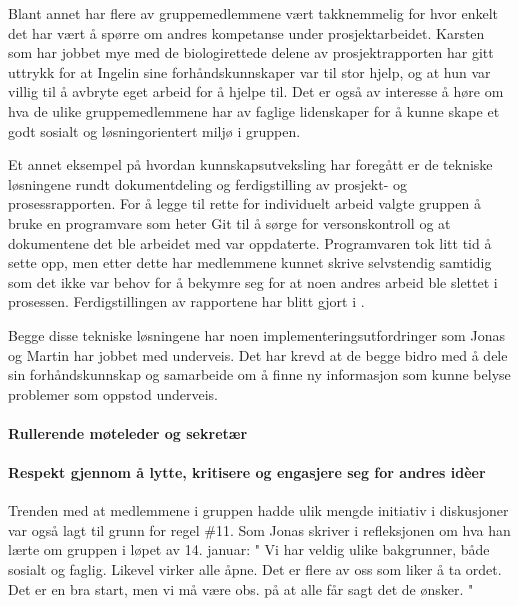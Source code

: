 Blant annet har flere av gruppemedlemmene vært takknemmelig for hvor enkelt det har vært å spørre om andres kompetanse under prosjektarbeidet.
Karsten som har jobbet mye med de biologirettede delene av prosjektrapporten har gitt uttrykk for at Ingelin sine forhåndskunnskaper var til stor hjelp, og at hun var villig til å avbryte eget arbeid for å hjelpe til.
Det er også av interesse å høre om hva de ulike gruppemedlemmene har av faglige lidenskaper for å kunne skape et godt sosialt og løsningorientert miljø i gruppen.

Et annet eksempel på hvordan kunnskapsutveksling har foregått er de tekniske løsningene rundt dokumentdeling og ferdigstilling av prosjekt- og prosessrapporten.
For å legge til rette for individuelt arbeid valgte gruppen å bruke en programvare som heter Git til å sørge for versonskontroll og at dokumentene det ble arbeidet med var oppdaterte.
Programvaren tok litt tid å sette opp, men etter dette har medlemmene kunnet skrive selvstendig samtidig som det ikke var behov for å bekymre seg for at noen andres arbeid ble slettet i prosessen.
Ferdigstillingen av rapportene har blitt gjort i \Latex.

Begge disse tekniske løsningene har noen implementeringsutfordringer som Jonas og Martin har jobbet med underveis.
Det har krevd at de begge bidro med å dele sin forhåndskunnskap og samarbeide om å finne ny informasjon som kunne belyse problemer som oppstod underveis.



\paragraph{Rullerende møteleder og sekretær}



\paragraph{Respekt gjennom å lytte, kritisere og engasjere seg for andres id\`{e}er}
Trenden med at medlemmene i gruppen hadde ulik mengde initiativ i diskusjoner var også lagt til grunn for regel \#11.
Som Jonas skriver i refleksjonen om hva han lærte om gruppen i løpet av 14. januar:
"
Vi har veldig ulike bakgrunner, både sosialt og faglig. Likevel virker alle åpne. Det er flere av oss som liker å ta ordet. Det er en bra start, men vi må være obs. på at alle får sagt det de ønsker.
"


















